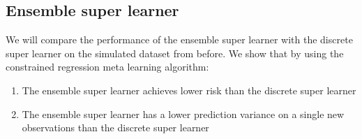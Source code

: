 \documentclass[./main.tex]{subfiles}
\begin{document}
\subsection{Ensemble super learner} \label{sim_esl}
We will compare the performance of the ensemble super learner with the discrete super learner on the simulated dataset from before. We show that by using the constrained regression meta learning algorithm:
\begin{enumerate}
    \item The ensemble super learner achieves lower risk than the discrete super learner
    \item The ensemble super learner has a lower prediction variance on a single new observations than the discrete super learner
\end{enumerate}
\end{document}
